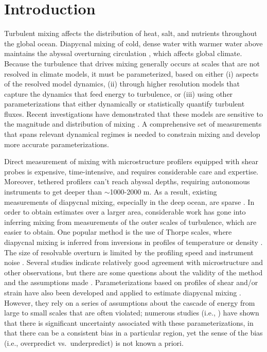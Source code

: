 \documentclass{ametsoc}
\begin{document}


\section{Introduction}

Turbulent mixing affects the distribution of heat, salt, and nutrients throughout the global ocean. Diapycnal mixing  of cold, dense water with warmer water above maintains the abyssal overturning circulation \citep{munk66,munkwunsch98}, which affects global climate. Because the turbulence that drives mixing generally occurs at scales that are not resolved in climate models, it must be parameterized, based on either (i) aspects of the resolved model dynamics, (ii) through higher resolution models that capture the dynamics that feed energy to turbulence, or (iii) using other parameterizations that either dynamically or statistically quantify turbulent fluxes. Recent investigations have demonstrated that these models are sensitive to the magnitude and distribution of mixing \citep{meletetal13}. A comprehensive set of measurements that spans relevant dynamical regimes is needed to constrain mixing and develop more accurate parameterizations.

Direct measurement of mixing with microstructure profilers equipped with shear probes is expensive, time-intensive, and requires considerable care and expertise. Moreover, tethered profilers can't reach abyssal depths, requiring autonomous instruments to get deeper than $\sim$1000-2000 m.  As a result, existing measurements of diapycnal mixing, especially in the deep ocean, are sparse \citep{waterhouseetal14}. In order to obtain estimates over a larger area, considerable work has gone into inferring mixing from measurements of the outer scales of turbulence, which are easier to obtain. One popular method is the use of Thorpe scales, where diapycnal mixing is inferred from inversions in profiles of temperature or density  \citep{thorpe77,dillon82}. The size of resolvable overturn is limited by the profiling speed and instrument noise \citep{galbraithkelley96}. Several studies indicate relatively good agreement with microstructure and other observations, but there are some questions about the validity of the method and the assumptions made \citep{materetal15,scotti15}. Parameterizations based on profiles of shear and/or strain have also been developed and applied to estimate diapycnal mixing \citep{gregg89a,kunzeetal06,polzinetal13,whalenetal12,whalenetal15}.  However, they rely on a series of assumptions about the cascade of energy from large to small scales that are often violated; numerous studies (i.e., \cite{watermanetal13}) have shown that there is significant uncertainty associated with these parameterizations, in that there can be a consistent bias in a particular region, yet the sense of the bias (i.e., overpredict vs.\ underpredict) is not known a priori. 
\end{document}
